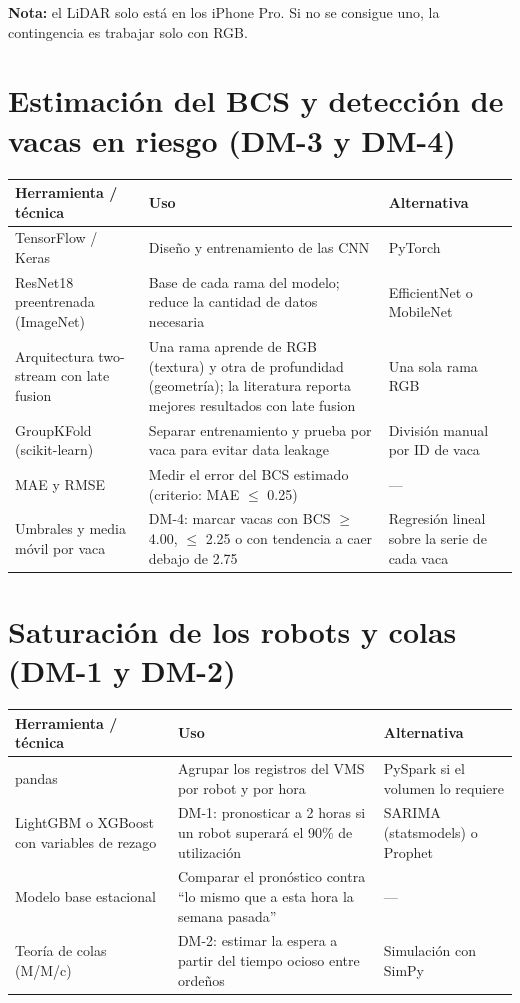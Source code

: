 \documentclass[11pt,letterpaper,DIV=12]{scrartcl}
\begin{document}
\medskip

\textbf{Nota:} el LiDAR solo está en los iPhone Pro. Si no se consigue uno, la contingencia es trabajar solo con RGB.

\section{Estimación del BCS y detección de vacas en riesgo (DM-3 y DM-4)}

\noindent
\begin{tabularx}{\textwidth}{>{\raggedright\arraybackslash}X>{\raggedright\arraybackslash}X>{\raggedright\arraybackslash}X}
  \toprule
  Herramienta / técnica & Uso & Alternativa \\
  \midrule
  TensorFlow / Keras & Diseño y entrenamiento de las CNN & PyTorch \\
  \addlinespace
  ResNet18 preentrenada (ImageNet) & Base de cada rama del modelo; reduce la cantidad de datos necesaria & EfficientNet o MobileNet \\
  \addlinespace
  Arquitectura two-stream con late fusion & Una rama aprende de RGB (textura) y otra de profundidad (geometría); la literatura reporta mejores resultados con late fusion & Una sola rama RGB \\
  \addlinespace
  GroupKFold (scikit-learn) & Separar entrenamiento y prueba por vaca para evitar data leakage & División manual por ID de vaca \\
  \addlinespace
  MAE y RMSE & Medir el error del BCS estimado (criterio: MAE $\leq$ 0.25) & --- \\
  \addlinespace
  Umbrales y media móvil por vaca & DM-4: marcar vacas con BCS $\geq$ 4.00, $\leq$ 2.25 o con tendencia a caer debajo de 2.75 & Regresión lineal sobre la serie de cada vaca \\
  \bottomrule
\end{tabularx}

\section{Saturación de los robots y colas (DM-1 y DM-2)}

\noindent
\begin{tabularx}{\textwidth}{>{\raggedright\arraybackslash}X>{\raggedright\arraybackslash}X>{\raggedright\arraybackslash}X}
  \toprule
  Herramienta / técnica & Uso & Alternativa \\
  \midrule
  pandas & Agrupar los registros del VMS por robot y por hora & PySpark si el volumen lo requiere \\
  \addlinespace
  LightGBM o XGBoost con variables de rezago & DM-1: pronosticar a 2 horas si un robot superará el 90\% de utilización & SARIMA (statsmodels) o Prophet \\
  \addlinespace
  Modelo base estacional & Comparar el pronóstico contra ``lo mismo que a esta hora la semana pasada'' & --- \\
  \addlinespace
  Teoría de colas (M/M/c) & DM-2: estimar la espera a partir del tiempo ocioso entre ordeños & Simulación con SimPy \\
  \bottomrule
\end{tabularx}
\end{document}
